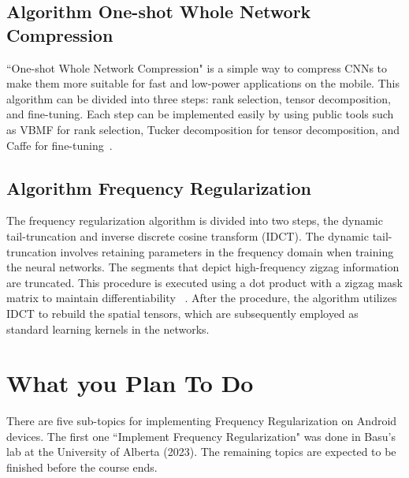 \documentclass{article}
\begin{document}
\subsection{Algorithm One-shot Whole Network Compression}\label{oneshot}
``One-shot Whole Network Compression" is a simple way to compress CNNs to make them more suitable for fast and low-power applications on the mobile. This algorithm can be divided into three steps: rank selection, tensor decomposition, and fine-tuning. Each step can be implemented easily by using public tools such as VBMF for rank selection, Tucker decomposition for tensor decomposition, and Caffe for fine-tuning~\cite{kim2016compression}.

\subsection{Algorithm Frequency Regularization}\label{fr}
The frequency regularization algorithm is divided into two steps, the dynamic tail-truncation and inverse discrete cosine transform (IDCT). The dynamic tail-truncation involves retaining parameters in the frequency domain when training the neural networks. The segments that depict high-frequency zigzag information are truncated. This procedure is executed using a dot product with a zigzag mask matrix to maintain differentiability ~\cite{zhao2023frequency}. After the procedure, the algorithm utilizes IDCT to rebuild the spatial tensors, which are subsequently employed as standard learning kernels in the networks.


\section{What you Plan To Do}
There are five sub-topics for implementing Frequency Regularization on Android devices. The first one ``Implement Frequency Regularization" was done in Basu's lab at the University of Alberta (2023). The remaining topics are expected to be finished before the course ends.
\end{document}
